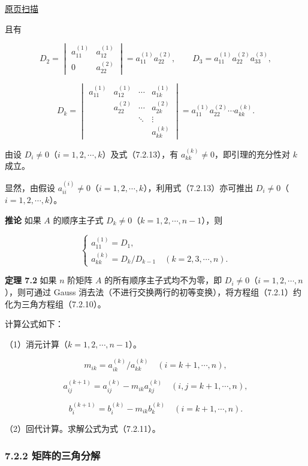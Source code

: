 \documentclass[
  10pt,
  fontset=fandol]{ctexart}
\begin{document}
\href{../../source-images/pdf-181.jpeg}{原页扫描}

且有

\[
D_2=\begin{vmatrix}a_{11}^{(1)}&a_{12}^{(1)}\\0&a_{22}^{(2)}\end{vmatrix}
=a_{11}^{(1)}a_{22}^{(2)},\qquad
D_3=a_{11}^{(1)}a_{22}^{(2)}a_{33}^{(3)},
\]

\[
D_k=\begin{vmatrix}
a_{11}^{(1)}&a_{12}^{(1)}&\cdots&a_{1k}^{(1)}\\
&a_{22}^{(2)}&\cdots&a_{2k}^{(2)}\\
&&\ddots&\vdots\\
&&&a_{kk}^{(k)}
\end{vmatrix}
=a_{11}^{(1)}a_{22}^{(2)}\cdots a_{kk}^{(k)}.
\tag{7.2.13}
\]

由设 \(D_i\ne0\)（\(i=1,2,\cdots,k\)）及式（7.2.13），有 \(a_{kk}^{(k)}\ne0\)，即引理的充分性对 \(k\) 成立。

显然，由假设 \(a_{ii}^{(i)}\ne0\)（\(i=1,2,\cdots,k\)），利用式（7.2.13）亦可推出 \(D_i\ne0\)（\(i=1,2,\cdots,k\)）。

\textbf{推论} 如果 \(A\) 的顺序主子式 \(D_k\ne0\)（\(k=1,2,\cdots,n-1\)），则

\[
\begin{cases}
a_{11}^{(1)}=D_1,\\
a_{kk}^{(k)}=D_k/D_{k-1}\quad(k=2,3,\cdots,n).
\end{cases}
\]

\textbf{定理 7.2} 如果 \(n\) 阶矩阵 \(A\) 的所有顺序主子式均不为零，即 \(D_i\ne0\)（\(i=1,2,\cdots,n\)），则可通过 Gauss 消去法（不进行交换两行的初等变换），将方程组（7.2.1）约化为三角方程组（7.2.10）。

计算公式如下：

（1）消元计算（\(k=1,2,\cdots,n-1\)）。

\[m_{ik}=a_{ik}^{(k)}/a_{kk}^{(k)}\quad(i=k+1,\cdots,n),\]

\[a_{ij}^{(k+1)}=a_{ij}^{(k)}-m_{ik}a_{kj}^{(k)}\quad(i,j=k+1,\cdots,n),\]

\[b_i^{(k+1)}=b_i^{(k)}-m_{ik}b_k^{(k)}\quad(i=k+1,\cdots,n).\]

（2）回代计算。求解公式为式（7.2.11）。

\subsubsection{7.2.2 矩阵的三角分解}\label{ux77e9ux9635ux7684ux4e09ux89d2ux5206ux89e3}
\end{document}

